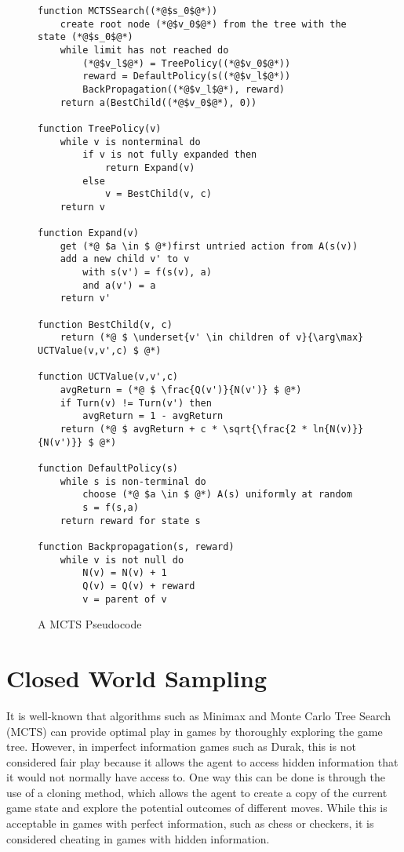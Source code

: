 \begin{figure}[h]
\captionsetup{justification=centering}
\begin{lstlisting}
function MCTSSearch((*@$s_0$@*))
	create root node (*@$v_0$@*) from the tree with the state (*@$s_0$@*)
	while limit has not reached do
		(*@$v_l$@*) = TreePolicy((*@$v_0$@*))
		reward = DefaultPolicy(s((*@$v_l$@*))
		BackPropagation((*@$v_l$@*), reward)
	return a(BestChild((*@$v_0$@*), 0))
	
function TreePolicy(v)
	while v is nonterminal do 
		if v is not fully expanded then
			return Expand(v)
		else
			v = BestChild(v, c)
	return v

function Expand(v)
	get (*@ $a \in $ @*)first untried action from A(s(v))
	add a new child v' to v
		with s(v') = f(s(v), a) 
		and a(v') = a
	return v'
	
function BestChild(v, c)
	return (*@ $ \underset{v' \in children of v}{\arg\max} UCTValue(v,v',c) $ @*)
	
function UCTValue(v,v',c)
	avgReturn = (*@ $ \frac{Q(v')}{N(v')} $ @*)
	if Turn(v) != Turn(v') then 
		avgReturn = 1 - avgReturn
	return (*@ $ avgReturn + c * \sqrt{\frac{2 * ln{N(v)}}{N(v')}} $ @*)
	
function DefaultPolicy(s)
	while s is non-terminal do
		choose (*@ $a \in $ @*) A(s) uniformly at random
		s = f(s,a)
	return reward for state s

function Backpropagation(s, reward)
	while v is not null do
		N(v) = N(v) + 1
		Q(v) = Q(v) + reward
		v = parent of v
\end{lstlisting}
\caption{A MCTS Pseudocode}
\label{fig:mctsREST}
\end{figure}

\section{Closed World Sampling}
\label{closedWorld}
It is well-known that algorithms such as Minimax and Monte Carlo Tree Search (MCTS) can provide optimal play in games by thoroughly exploring the game tree. However, in imperfect information games such as Durak, this is not considered fair play because it allows the agent to access hidden information that it would not normally have access to. One way this can be done is through the use of a cloning method, which allows the agent to create a copy of the current game state and explore the potential outcomes of different moves. While this is acceptable in games with perfect information, such as chess or checkers, it is considered cheating in games with hidden information.

